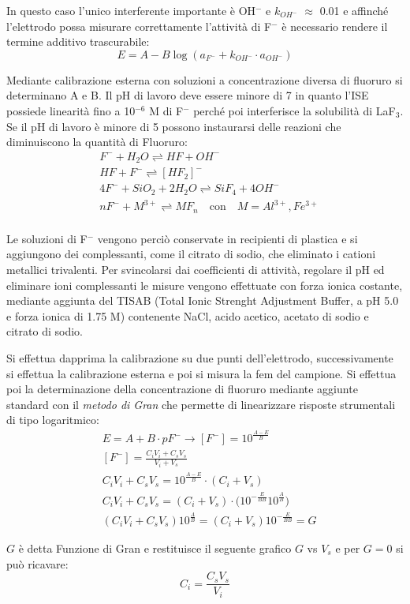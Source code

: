 In questo caso l'unico interferente importante è OH$^-$ e $k_{OH^-}$ $\approx$ 0.01 e affinché l'elettrodo possa misurare correttamente l'attività di F$^-$ è necessario rendere il termine additivo trascurabile:
\[
E = A - B \log (a_{F^-} + k_{OH^-} \cdot a_{OH^-})
\]


Mediante calibrazione esterna con soluzioni a concentrazione diversa di fluoruro si determinano A e B.
Il pH di lavoro deve essere minore di 7 in quanto l'ISE possiede linearità fino a 10$^{-6}$ M di F$^-$ perché poi interferisce la solubilità di LaF$_3$.
Se il pH di lavoro è minore di 5 possono instaurarsi delle reazioni che diminuiscono la quantità di Fluoruro:
\begin{align*}
& F^- + H_2O \rightleftharpoons HF + OH^-\\
& HF + F^- \rightleftharpoons [HF_2]^-\\
& 4 F^- + SiO_2 + 2 H_2O \rightleftharpoons SiF_4 + 4 OH^-\\
& n F^- + M^{3+} \rightleftharpoons MF_n \quad \text{con} \quad M = Al^{3+}, Fe^{3+}\\
\end{align*}

Le soluzioni di F$^-$ vengono perciò conservate in recipienti di plastica e si aggiungono dei complessanti, come il citrato di sodio, che eliminato i cationi metallici trivalenti.
Per svincolarsi dai coefficienti di attività, regolare il pH ed eliminare ioni complessanti le misure vengono effettuate con forza ionica costante, mediante aggiunta del TISAB
(Total Ionic Strenght Adjustment Buffer, a pH 5.0 e forza ionica di 1.75 M) contenente NaCl, acido acetico, acetato di sodio e citrato di sodio.


Si effettua dapprima la calibrazione su due punti dell'elettrodo, successivamente si effettua la calibrazione esterna e poi si misura la fem del campione.
Si effettua poi la determinazione della concentrazione di fluoruro mediante aggiunte standard con il \emph{metodo di Gran} che permette di linearizzare risposte strumentali di tipo logaritmico:
\begin{align*}
& E = A + B \cdot pF^- \longrightarrow [F^-] = 10^{\frac{A-E}{B}}\\
& [F^-] = \frac{C_i V_i + C_s V_s}{V_i + V_s}\\
& C_i V_i + C_s V_s = 10^{\frac{A-E}{B}} \cdot (C_i + V_s)\\
& C_i V_i + C_s V_s = (C_i + V_s) \cdot \biggl(10^{-\frac{E}{BB}} 10^{\frac{A}{B}}\biggr)\\
& (C_i V_i + C_s V_s) 10^{\frac{A}{B}} = (C_i + V_s) 10^{-\frac{E}{BB}} = G
\end{align*}

$G$ è detta Funzione di Gran e restituisce il seguente grafico $G$ vs $V_s$ e per $G=0$ si può ricavare:
\[
C_i = \frac{C_s V_s}{V_i}
\]
